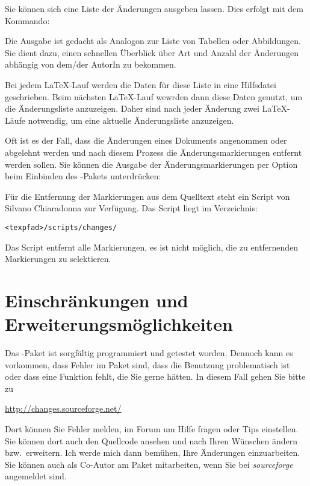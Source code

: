 
Sie können sich eine Liste der Änderungen ausgeben lassen.
Dies erfolgt mit dem Kommando:


Die Ausgabe ist gedacht als Analogon zur Liste von Tabellen oder Abbildungen.
Sie dient dazu, einen schnellen Überblick über Art und Anzahl der Änderungen abhängig von dem/der AutorIn zu bekommen.

Bei jedem \LaTeX-Lauf werden die Daten für diese Liste in eine Hilfsdatei geschrieben.
Beim nächsten \LaTeX-Lauf wewrden dann diese Daten genutzt, um die Änderungsliste anzuzeigen.
Daher sind nach jeder Änderung zwei \LaTeX-Läufe notwendig, um eine aktuelle Änderungsliste anzuzeigen.


Oft ist es der Fall, dass die Änderungen eines Dokuments angenommen oder abgelehnt werden und nach diesem Prozess die Änderungsmarkierungen entfernt werden sollen.
Sie können die Ausgabe der Änderungsmarkierungen per Option beim Einbinden des -Pakets unterdrücken:


Für die Entfernung der Markierungen aus dem Quelltext steht ein Script von Silvano Chiaradonna zur Verfügung.
Das Script liegt im Verzeichnis:

\texttt{<texpfad>/scripts/changes/}

Das Script entfernt alle Markierungen, es ist nicht möglich, die zu entfernenden Markierungen zu selektieren.

\section{Einschränkungen und Erweiterungsmöglichkeiten}
\label{sec:limitations}

Das -Paket ist sorgfältig programmiert und getestet worden.
Dennoch kann es vorkommen, dass Fehler im Paket sind, dass die Benutzung problematisch ist oder dass eine Funktion fehlt, die Sie gerne hätten.
In diesem Fall gehen Sie bitte zu

\url{http://changes.sourceforge.net/}

Dort können Sie Fehler melden, im Forum um Hilfe fragen oder Tips einstellen.
Sie können dort auch den Quellcode ansehen und nach Ihren Wünschen ändern bzw.\ erweitern.
Ich werde mich dann bemühen, Ihre Änderungen einzuarbeiten.
Sie können auch als Co-Autor am Paket mitarbeiten, wenn Sie bei \emph{sourceforge} angemeldet sind.

